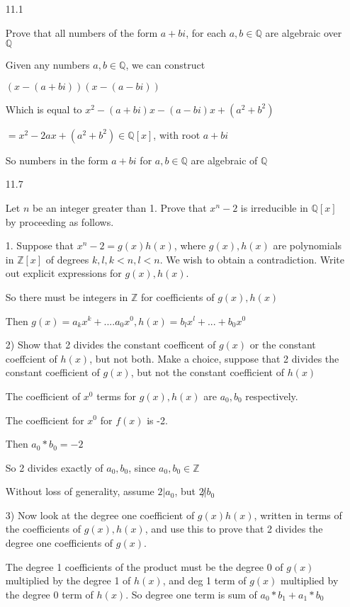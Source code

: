 \documentclass[12pt]{article}
\begin{document}
\begin{itemize}

\newpage
\item[11.1]

Prove that all numbers of the form $a + bi$, for each $a, b \in \mathbb{Q}$ are algebraic over $\mathbb{Q}$

Given any numbers $a, b \in\mathbb{Q}$, we can construct

$(x - (a+bi))(x - (a-bi))$

Which is equal to $x^2 - (a+bi)x - (a-bi)x + (a^2 + b^2)$

$=x^2 - 2ax + (a^2 + b^2) \in\mathbb{Q}[x]$, with root $a + bi$

So numbers in the form $a + bi$ for $a,b \in\mathbb{Q}$ are algebraic of $\mathbb{Q}$

\newpage
\item[11.7]

Let $n$ be an integer greater than 1. Prove that $x^n -2$ is irreducible in $\mathbb{Q}[x]$ by proceeding as follows.

1. Suppose that $x^n - 2 = g(x)h(x)$, where $g(x), h(x)$ are polynomials in $\mathbb{Z}[x]$ of degrees $k, l, k < n, l < n$. We wish to obtain a contradiction. Write out explicit expressions for $g(x), h(x)$.

So there must be integers in $\mathbb{Z}$ for coefficients of $g(x),h(x)$

Then $g(x)= a_k x^k + .... a_0 x^0, h(x) = b_l x^l +... + b_0 x^0$


2) Show that 2 divides the constant coefficent of $g(x)$ or the constant coeffcient of $h(x)$, but not both. Make a choice, suppose that 2 divides the constant coefficient of $g(x)$, but not the constant coefficient of $h(x)$

The coefficient of $x^0$ terms for $g(x), h(x)$ are $a_0, b_0$ respectively.

The coefficient for $x^0$ for $f(x)$ is -2.

Then $a_0 * b_0 = -2$

So 2 divides exactly of $a_0, b_0$, since $a_0,b_0 \in \mathbb{Z}$

Without loss of generality, assume $2|a_0$, but $2\not| b_0$ 

3) Now look at the degree one coefficient of $g(x)h(x)$, written in terms of the coefficients of $g(x),h(x)$, and use this to prove that 2 divides the degree one coefficients of $g(x)$.

The degree 1 coefficients of the product must be the degree 0 of $g(x)$ multiplied by the degree 1 of $h(x)$, and deg 1 term of $g(x)$ multiplied by the degree 0 term of $h(x)$. So degree one term is sum of $a_0 *b_1 + a_1*b_0$


\end{itemize}
\end{document}
